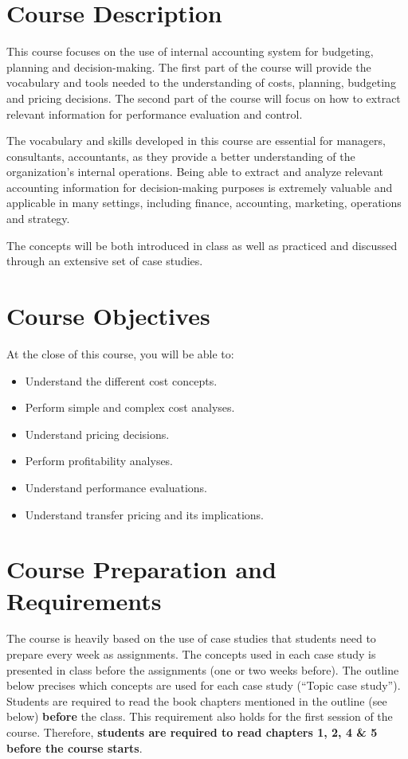 \documentclass{article}
\begin{document}
\newpage

\section*{Course Description}
This course focuses on the use of internal accounting system for budgeting,
planning and decision-making.
The first part of the course will provide the vocabulary and tools needed to
the understanding of costs, planning, budgeting and pricing decisions.
The second part of the course will focus on how to extract relevant information
for performance evaluation and control.

The vocabulary and skills developed in this course are essential for managers,
consultants, accountants, as they provide a better understanding of the
organization's internal operations. Being able to extract and analyze
relevant accounting information for decision-making purposes is extremely
valuable and applicable in many settings, including finance, accounting,
marketing, operations and strategy.

The concepts will be both introduced in class as well as practiced and
discussed through an extensive set of case studies.

\section*{Course Objectives}

At the close of this course, you will be able to:
\begin{itemize}
	\item Understand the different cost concepts.
	\item Perform simple and complex cost analyses.
	\item Understand pricing decisions.
	\item Perform profitability analyses.
	\item Understand performance evaluations.
	\item Understand transfer pricing and its implications.
\end{itemize}

\section*{Course Preparation and Requirements}
The course is heavily based on the use of case studies that students need to
prepare every week as assignments.
The concepts used in each case study is presented in class before the assignments
(one or two weeks before).
The outline below precises which concepts are used for each case study (``Topic case study'').
Students are required to read the book chapters mentioned in the outline (see below)
{\bf before} the class. This requirement also holds for the first session of the course.
Therefore, {\bf students are required to read chapters 1, 2, 4 \& 5 before the course
starts}.
\end{document}
